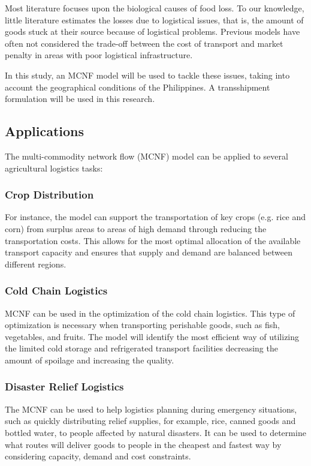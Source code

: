 \documentclass{icsthesis}
\begin{document}
\begin{mainmatter}
Most literature focuses upon the biological causes of food loss. To our knowledge, little literature estimates the losses due to logistical issues, that is, the amount of goods stuck at their source because of logistical problems. Previous models have often not considered the trade-off between the cost of transport and market penalty in areas with poor logistical infrastructure.

In this study, an MCNF model will be used to tackle these issues, taking into account the geographical conditions of the Philippines. A transshipment formulation will be used in this research.

\subsection{Applications} 
The multi-commodity network flow (MCNF) model can be applied to several agricultural logistics tasks:


\subsubsection{Crop Distribution}
For instance, the model can support the transportation of key crops (e.g. rice and corn) from surplus areas to areas of high demand through reducing the transportation costs. This allows for the most optimal allocation of the available transport capacity and ensures that supply and demand are balanced between different regions.


\subsubsection{Cold Chain Logistics}
MCNF can be used in the optimization of the cold chain logistics. This type of optimization is necessary when transporting perishable goods, such as fish, vegetables, and fruits. The model will identify the most efficient way of utilizing the limited cold storage and refrigerated transport facilities decreasing the amount of spoilage and increasing the quality.


\subsubsection{Disaster Relief Logistics}
The MCNF can be used to help logistics planning during emergency situations, such as quickly distributing relief supplies, for example, rice, canned goods and bottled water, to people affected by natural disasters. It can be used to determine what routes will deliver goods to people in the cheapest and fastest way by considering capacity, demand and cost constraints.



\end{mainmatter}
\end{document}
